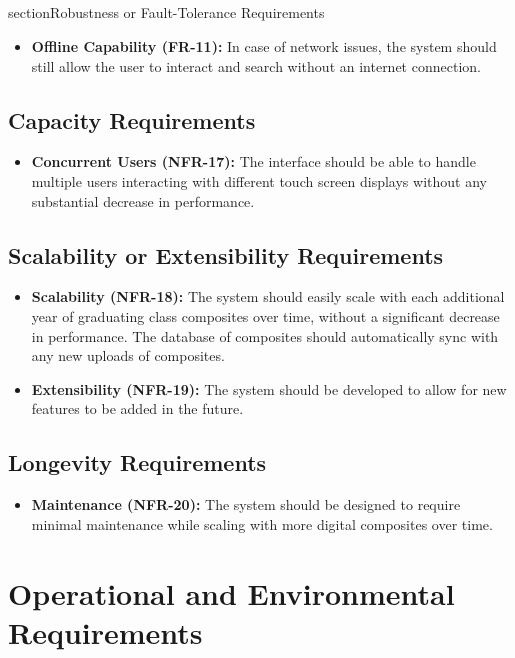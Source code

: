 \documentclass[12pt]{article}
\begin{document}
\subsection{}section{Robustness or Fault-Tolerance Requirements}
\begin{itemize}
    \item \textbf{Offline Capability (FR-11):} In case of network issues, the system should still allow the user to interact and search without an internet connection.
\end{itemize}

\subsection{Capacity Requirements}
\begin{itemize}
    \item \textbf{Concurrent Users (NFR-17):} The interface should be able to handle multiple users interacting with different touch screen displays without any substantial decrease in performance.
\end{itemize}

\subsection{Scalability or Extensibility Requirements}
\begin{itemize}
    \item \textbf{Scalability (NFR-18):} The system should easily scale with each additional year of graduating class composites over time, without a significant decrease in performance. The database of composites should automatically sync with any new uploads of composites.
    \item \textbf{Extensibility (NFR-19):} The system should be developed to allow for new features to be added in the future.
\end{itemize}

\subsection{Longevity Requirements}
\begin{itemize}
    \item \textbf{Maintenance (NFR-20):} The system should be designed to require minimal maintenance while scaling with more digital composites over time.
\end{itemize}

\section{Operational and Environmental Requirements}
\end{document}
